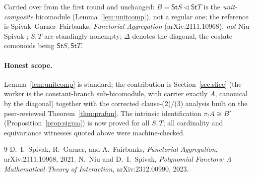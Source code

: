 \documentclass[11pt]{article}
\newcommand{\comp}{\mathbin{\triangleleft}}       %
\newcommand{\St}{\mathsf{St}}                      %
\theoremstyle{plain}
\theoremstyle{definition}
\theoremstyle{remark}
\begin{document}
\noindent Carried over from the first round and unchanged: $B=\St S\comp\St T$ is the
\emph{unit-composite} bicomodule (Lemma~\ref{lem:unitcomp}), not a regular one; the reference
\cite{SGF} is Spivak--Garner--Fairbanks, \emph{Functorial Aggregation} (arXiv:2111.10968),
\emph{not} Niu--Spivak \cite{NiuSpivak}; $S,T$ are standingly nonempty; $\Delta$ denotes the
diagonal, the costate comonoids being $\St S,\St T$.

\paragraph{Honest scope.}
Lemma~\ref{lem:unitcomp} is standard; the contribution is Section~\ref{sec:slice} (the
worker is the constant-branch sub-bicomodule, with carrier exactly $A$, canonical by the
diagonal) together with the corrected clause-(2)/(3) analysis built on the peer-reviewed
Theorem~\ref{thm:prafun}. The intrinsic identification $\pi_!A\cong B'$
(Proposition~\ref{prop:sigma}) is now proved for all $S,T$; all cardinality and equivariance
witnesses quoted above were machine-checked.

\begin{thebibliography}{9}
D.~I.\ Spivak, R.\ Garner, and A.\ Fairbanks,
\emph{Functorial Aggregation},
arXiv:2111.10968, 2021.
N.\ Niu and D.~I.\ Spivak,
\emph{Polynomial Functors: A Mathematical Theory of Interaction},
arXiv:2312.00990, 2023.
\end{thebibliography}
\end{document}

